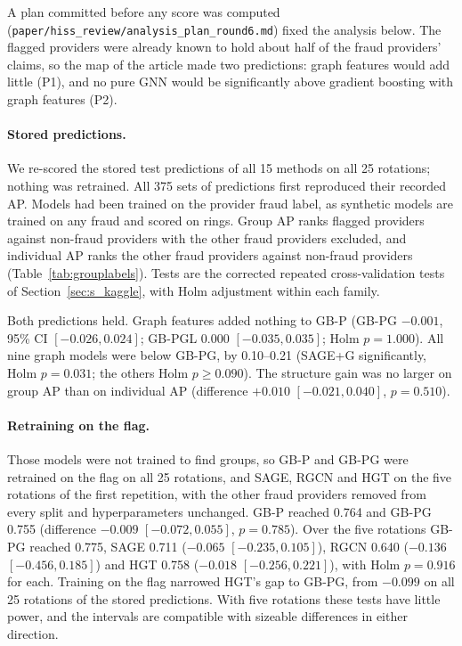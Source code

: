 \documentclass[pdflatex,sn-vancouver-num]{sn-jnl}
\begin{document}
A plan committed before any score was computed (\texttt{paper/\allowbreak hiss\_review/\allowbreak analysis\_plan\_round6.md}) fixed the
analysis below. The flagged providers were already known to hold about half of the fraud providers' claims, so the
map of the article made two predictions: graph features would add little (P1), and no pure GNN would be significantly
above gradient boosting with graph features (P2).

\paragraph{Stored predictions.} We re-scored the stored test predictions of all 15 methods on all 25 rotations; nothing
was retrained. All 375 sets of predictions first reproduced their recorded AP. Models had been trained on the
provider fraud label, as synthetic models are trained on any fraud and scored on rings. Group AP ranks flagged
providers against non-fraud providers with the other fraud providers excluded, and individual AP ranks the other fraud
providers against non-fraud providers (Table~\ref{tab:grouplabels}). Tests are the corrected repeated cross-validation
tests of Section~\ref{sec:s_kaggle}, with Holm adjustment within each family.

Both predictions held. Graph features added nothing to GB-P (GB-PG $-0.001$, 95\% CI $[-0.026, 0.024]$; GB-PGL
$0.000$ $[-0.035, 0.035]$; Holm $p=1.000$). All nine graph models were below GB-PG, by 0.10--0.21 (SAGE+G significantly,
Holm $p=0.031$; the others Holm $p\ge0.090$). The structure gain was no larger on group AP than on individual AP
(difference $+0.010$ $[-0.021, 0.040]$, $p=0.510$).

\paragraph{Retraining on the flag.} Those models were not trained to find groups, so GB-P and GB-PG were retrained on the
flag on all 25 rotations, and SAGE, RGCN and HGT on the five rotations of the first repetition, with the other fraud
providers removed from every split and hyperparameters unchanged. GB-P reached 0.764 and GB-PG 0.755 (difference $-0.009$
$[-0.072, 0.055]$, $p=0.785$). Over the five rotations GB-PG reached 0.775, SAGE 0.711 ($-0.065$ $[-0.235, 0.105]$), RGCN
0.640 ($-0.136$ $[-0.456, 0.185]$) and HGT 0.758 ($-0.018$ $[-0.256, 0.221]$), with Holm $p=0.916$ for each. Training on
the flag narrowed HGT's gap to GB-PG, from $-0.099$ on all 25 rotations of the stored predictions. With five rotations
these tests have little power, and the intervals are compatible with sizeable differences in either direction.
\end{document}
